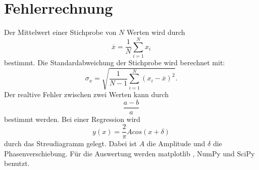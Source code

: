 \section{Fehlerrechnung}

Der Mittelwert einer Stichprobe von $N$ Werten wird durch
\begin{equation*}
    \overline{x} = \frac{1}{N} \sum_{i=1}^N x_i
    \label{eqn:mittelwert}
\end{equation*}
bestimmt.
\newline
Die Standardabweichung der Stichprobe wird berechnet mit:
\begin{equation*}
    \sigma_x = \sqrt{\frac{1}{N-1} \sum_{i=1}^N (x_i - \overline{x})^2}.
    \label{eqn:standard}
\end{equation*}
\newline
Der realtive Fehler zwischen zwei Werten kann durch
\begin{equation*}
    \frac{a-b}{a}
\end{equation*}
bestimmt werden.
\newline
Bei einer Regression wird
\begin{equation*}
    y(x) = \frac{2}{\pi} A cos(x+\delta)
\end{equation*}
durch das Streudiagramm gelegt.
Dabei ist $A$ die Amplitude und $\delta$ die Phasenverschiebung.
\newline
Für die Auswertung werden matplotlib \cite{matplotlib}, NumPy \cite{numpy} und SciPy \cite{scipy} benutzt.